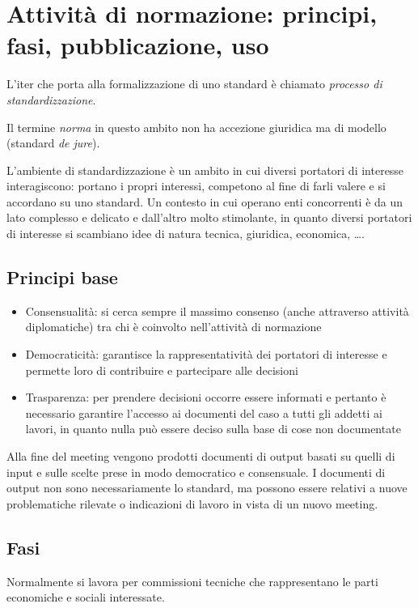 \section{Attività di normazione: principi, fasi, pubblicazione, uso}

L'iter che porta alla formalizzazione di uno standard è chiamato \textit{processo di standardizzazione}.

Il termine \textit{norma} in questo ambito non ha accezione giuridica ma di modello (standard \textit{de jure}).

L'ambiente di standardizzazione è un ambito in cui diversi portatori di interesse interagiscono: portano i propri interessi, competono al fine di farli valere e si accordano su uno standard. 
Un contesto in cui operano enti concorrenti è da un lato complesso e delicato e dall'altro molto stimolante, in quanto diversi portatori di interesse si scambiano idee di natura tecnica, giuridica, economica, \dots.

\subsection{Principi base}
\begin{itemize}
    \item Consensualità: si cerca sempre il massimo consenso (anche attraverso attività diplomatiche) tra chi è coinvolto nell'attività di normazione
    \item Democraticità: garantisce la rappresentatività dei portatori di interesse e permette loro di contribuire e partecipare alle decisioni
    \item Trasparenza: per prendere decisioni occorre essere informati e pertanto è necessario garantire l'accesso ai documenti del caso a tutti gli addetti ai lavori, in quanto nulla può essere deciso sulla base di cose non documentate
\end{itemize}

Alla fine del meeting vengono prodotti documenti di output basati su quelli di input e sulle scelte prese in modo democratico e consensuale. 
I documenti di output non sono necessariamente lo standard, ma possono essere relativi a nuove problematiche rilevate o indicazioni di lavoro in vista di un nuovo meeting. 

\subsection{Fasi}
Normalmente si lavora per commissioni tecniche che rappresentano le parti economiche e sociali interessate.

